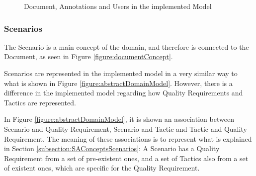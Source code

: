 \documentclass{llncs}
\begin{document}
\begin{figure}
\centering
\renewcommand {\umltextcolor}{black}
\renewcommand {\umlfillcolor}{none}
\renewcommand {\umldrawcolor}{black}

\caption{Document, Annotations and Users in the implemented Model}
\label{figure:modelDocUserAnnot}
\end{figure} 
 
\subsubsection{Scenarios}
\label{subsection:modelScenarios}
The Scenario is a main concept of the domain, and therefore is connected to the Document, as seen in Figure \ref{figure:documentConcept}. 

Scenarios are represented in the implemented model in a very similar way to what is shown in Figure \ref{figure:abstractDomainModel}. However, there is a difference in the implemented model regarding how Quality Requirements and Tactics are represented.

In Figure \ref{figure:abstractDomainModel}, it is shown an association between Scenario and Quality Requirement, Scenario and Tactic and Tactic and Quality Requirement. The meaning of these associations is to represent what is explained in Section \ref{subsection:SAConceptsScenarios}: A Scenario has a Quality Requirement from a set of pre-existent ones, and a set of Tactics also from a set of existent ones, which are specific for the Quality Requirement.
\end{document}
